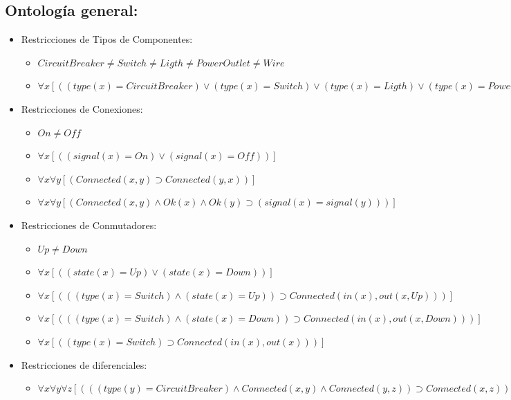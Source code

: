 \documentclass[10pt, a4paper,spanish]{article}
\begin{document}
		\subsection{Ontología general:}

			\begin{itemize}

				\item Restricciones de Tipos de Componentes:
				\begin{itemize}
					\item $ CircuitBreaker \neq Switch\neq Ligth \neq PowerOutlet \neq Wire   $
					\item $ \forall x [((type(x) = CircuitBreaker) \lor (type(x) = Switch) \lor (type(x) = Ligth) \lor (type(x) = PowerOutlet) \lor (type(x) = Wire))] $
				\end{itemize}
				\item Restricciones de Conexiones:
				\begin{itemize}
					\item $ On \neq Off $
					\item $ \forall x [((signal(x) = On) \lor (signal(x) = Off))] $
					\item $ \forall x \forall y [(Connected(x, y) \supset Connected(y, x))] $
					\item $ \forall x \forall y [(Connected(x, y) \land Ok(x) \land Ok(y) \supset (signal(x) = signal(y)))] $
				\end{itemize}

				\item Restricciones de Conmutadores:
				\begin{itemize}
					\item $ Up \neq Down $
					\item $ \forall x [( (state(x) = Up) \lor (state(x) = Down))] $
					\item $ \forall x [( ( (type(x) = Switch) \land (state(x) = Up) ) \supset Connected(in(x), out(x, Up)))] $
					\item $ \forall x [( ( (type(x) = Switch) \land (state(x) = Down) ) \supset Connected(in(x), out(x, Down)))] $
					\item $ \forall x [( (type(x) = Switch)  \supset Connected(in(x), out(x)))] $
				\end{itemize}

				\item Restricciones de diferenciales:
				\begin{itemize}
					\item $ \forall x \forall y \forall z [( ((type(y) = CircuitBreaker) \land Connected(x, y) \land Connected(y, z) ) \supset Connected(x, z))] $
				\end{itemize}


\end{itemize}
\end{document}
